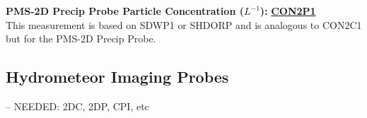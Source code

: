 \begin{hangparagraphs}
\textbf{PMS-2D Precip Probe Particle Concentration ($L^{-1}$): }\textbf{\uline{CON2P1}}\\
This measurement is based on SDWP1 or SHDORP and is analogous to CON2C1
but for the PMS-2D Precip Probe. 
\end{hangparagraphs}

\subsection{Hydrometeor Imaging Probes}

-- NEEDED: 2DC, 2DP, CPI, etc

